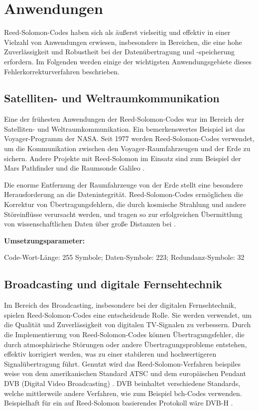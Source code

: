 \chapter{Anwendungen}\label{ch:application}

Reed-Solomon-Codes haben sich als äußerst vielseitig und effektiv in einer Vielzahl von Anwendungen erwiesen, insbesondere in Bereichen, die eine hohe Zuverlässigkeit und Robustheit bei der Datenübertragung und -speicherung erfordern. 
Im Folgenden werden einige der wichtigsten Anwendungsgebiete dieses Fehlerkorrekturverfahren beschrieben.

\section{Satelliten- und Weltraumkommunikation}

Eine der frühesten Anwendungen der Reed-Solomon-Codes war im Bereich der Satelliten- und Weltraumkommunikation. 
Ein bemerkenswertes Beispiel ist das Voyager-Programm der NASA. Seit 1977 werden Reed-Solomon-Codes verwendet, um die Kommunikation zwischen den Voyager-Raumfahrzeugen und der Erde zu sichern. 
Andere Projekte mit Reed-Solomon im Einsatz sind zum Beispiel der Mars Pathfinder und die Raumsonde Galileo \cite{wickerReedSolomonCodes1994}.

Die enorme Entfernung der Raumfahrzeuge von der Erde stellt eine besondere Herausforderung an die Datenintegrität. 
Reed-Solomon-Codes ermöglichen die Korrektur von Übertragungsfehlern, die durch kosmische Strahlung und andere Störeinflüsse verursacht werden, und tragen so zur erfolgreichen Übermittlung von wissenschaftlichen Daten über große Distanzen bei \cite{ludwigVoyagerTelecommunications2002}.

\textbf{Umsetzungsparameter:}

Code-Wort-Länge: 255 Symbole;
Daten-Symbole: 223;
Redundanz-Symbole: 32

\section{Broadcasting und digitale Fernsehtechnik}

Im Bereich des Broadcasting, insbesondere bei der digitalen Fernsehtechnik, spielen Reed-Solomon-Codes eine entscheidende Rolle. 
Sie werden verwendet, um die Qualität und Zuverlässigkeit von digitalen TV-Signalen zu verbessern. 
Durch die Implementierung von Reed-Solomon-Codes können Übertragungsfehler, die durch atmosphärische Störungen oder andere Übertragungsprobleme entstehen, effektiv korrigiert werden, was zu einer stabileren und hochwertigeren Signalübertragung führt.
Genutzt wird das Reed-Solomon-Verfahren beispiles weise von dem amerikanischen Standard ATSC und dem europäischen Pendant DVB (Digital Video Broadcasting) \cite{ilievAnalysisEvaluationReedSolomon2008}.
DVB beinhaltet verschiedene Standards, welche mittlerweile andere Verfahren, wie zum Beispiel \acrshort{bch}-Codes verwenden. 
Beispielhaft für ein auf Reed-Solomon basierendes Protokoll wäre DVB-H \cite{DVBH2024}. 

